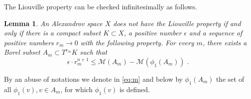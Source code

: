 \documentclass[12pt,leqno,intlimits]{amsart}
\numberwithin{equation}{section}
\newtheorem{lem}[thm]{Lemma}
\theoremstyle{definition}
\theoremstyle{remark}
\begin{document}
The Liouville property can be checked infinitesimally as follows.

\begin{lem} \label{infini}
An Alexandrov space $X$ \emph{does not} have the Liouville property if and only if there is a compact subset $K\subset X$, a positive number
$\epsilon$ and a sequence of positive numbers  $r_m \to 0$  with the following property.
 For every  $m$, there exists a Borel subset $A_m\subset T^{r_ m} K$ such that
 \begin{equation} \label{eq:m}
\epsilon \cdot r_m^{n +1} \leq \mathcal M (A_m) -\mathcal M (\phi _1 (A_m)) \;.
\end{equation}
\end{lem}
By an abuse of notations we denote in \eqref{eq:m}  and below by  $\phi_1 (A_m)$ the set of all $\phi _1(v), v\in A_m$, for which
$\phi _1(v)$ is defined.
\end{document}
